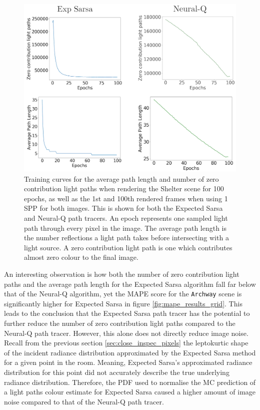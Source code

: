 \documentclass[../dissertation.tex]{subfiles}
\begin{document}
\begin{figure}[h]
\begin{center}
\includegraphics[width=\textwidth]{images/training_curves.png}    
\end{center}
\caption{Training curves for the average path length and number of zero contribution light paths when rendering the Shelter scene for 100 epochs, as well as the 1st and 100th rendered frames when using 1 SPP for both images. This is shown for both the Expected Sarsa and Neural-Q path tracers. An epoch represents one sampled light path through every pixel in the image. The average path length is the number reflections a light path takes before intersecting with a light source. A zero contribution light path is one which contributes almost zero colour to the final image.}
\label{fig:training_curves_archway}
\end{figure}

An interesting observation is how both the number of zero contribution light paths and the average path length for the Expected Sarsa algorithm fall far below that of the Neural-Q algorithm, yet the MAPE score for the \verb|Archway| scene is significantly higher for Expected Sarsa in figure \ref{fig:mape_results_grid}. This leads to the conclusion that the Expected Sarsa path tracer has the potential to further reduce the number of zero contribution light paths compared to the Neural-Q path tracer. However, this alone does not directly reduce image noise. Recall from the previous section \ref{sec:close_inspec_pixels} the leptokurtic shape of the incident radiance distribution approximated by the Expected Sarsa method for a given point in the room. Meaning, Expected Sarsa's approximated radiance distribution for this point did not accurately describe the true underlying radiance distribution. Therefore, the PDF used to normalise the MC prediction of a light paths colour estimate for Expected Sarsa caused a higher amount of image noise compared to that of the Neural-Q path tracer.
\end{document}

